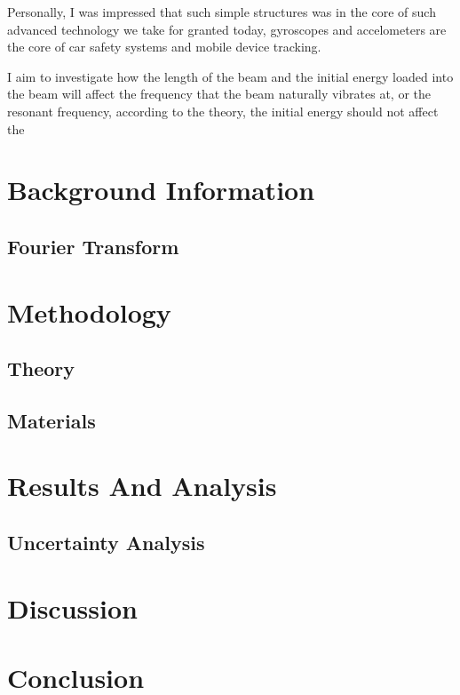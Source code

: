 \documentclass[a4paper,12pt]{article}
\begin{document}
    Personally, I was impressed that such simple structures was in the core of such advanced technology we take for granted today, gyroscopes and accelometers are the core of car safety systems and mobile device tracking.

    I aim to investigate how the length of the beam and the initial energy loaded into the beam will affect the frequency that the beam naturally vibrates at, or the resonant frequency, according to the theory, the initial energy should not affect the


\section{Background Information}%
    \subsection{Fourier Transform}

\section{Methodology}%
    \subsection{Theory}

    \subsection{Materials}


\section{Results And Analysis}%
    \subsection{Uncertainty Analysis}

\section{Discussion}%

\section{Conclusion}%

\printbibliography
\end{document}
